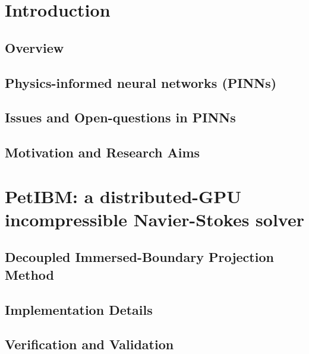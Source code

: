 \documentclass[font=STIX2]{gw-dissertation}[2021/11/19]
\begin{document}
\chapter{Introduction}

    \section{Overview}\label{sec:overview}
    

    \section{Physics-informed neural networks (PINNs)}\label{sec:pinn-review}
    

    \section{Issues and Open-questions in PINNs}\label{sec:pinn-issues}
    

    \section{Motivation and Research Aims}\label{sec:aims}
    

\chapter{PetIBM: a distributed-GPU incompressible Navier-Stokes solver}\label{chap:petibm}


    \section{Decoupled Immersed-Boundary Projection Method}\label{sec:petibm-math}
    

    \section{Implementation Details}\label{sec:petibm-impl}
    

    \section{Verification and Validation}\label{sec:petibm-vv}
    
\end{document}

